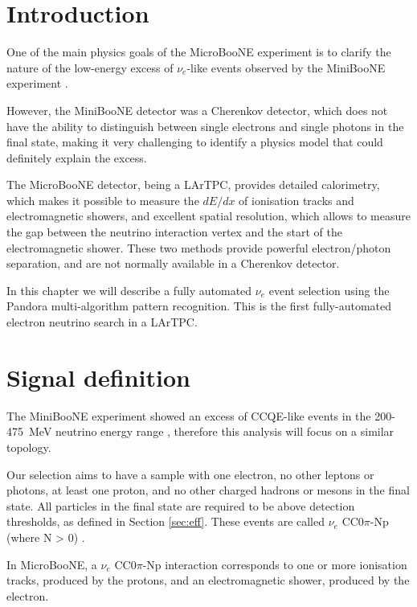 \section{Introduction}
One of the main physics goals of the MicroBooNE experiment is to clarify the nature of the low-energy excess of $\nu_{e}$-like events observed by the MiniBooNE experiment \cite{Aguilar-Arevalo:2018gpe}. 

However, the MiniBooNE detector was a Cherenkov detector, which does not have the ability to distinguish between single electrons and single photons in the final state, making it very challenging to identify a physics model that could definitely explain the excess.

The MicroBooNE detector, being a LArTPC, provides detailed  calorimetry, which makes it possible to measure the $dE/dx$ of ionisation tracks and electromagnetic showers, and excellent spatial resolution, which allows to measure the gap between the neutrino interaction vertex and the start of the electromagnetic shower. These two methods provide powerful electron/photon separation, and are not normally available in a Cherenkov detector. 

In this chapter we will describe a fully automated $\nu_{e}$ event selection using the Pandora multi-algorithm pattern recognition. This is the first fully-automated electron neutrino search in a LArTPC.

\section{Signal definition}
The MiniBooNE experiment showed an excess of CCQE-like events in the 200-475~MeV neutrino energy range \cite{Aguilar-Arevalo:2018gpe}, therefore this analysis will focus on a similar topology.

Our selection aims to have a sample with one electron, no other leptons or photons, at least one proton, and no other charged hadrons or mesons in the final state. All particles in the final state are required to be above detection thresholds, as defined in Section \ref{sec:eff}. These events are called $\nu_{e}$ CC0$\pi$-Np (where N > 0) \cite{Katori:2013nca}. 

In MicroBooNE, a $\nu_{e}$ CC0$\pi$-Np interaction corresponds to one or more ionisation tracks, produced by the protons, and an electromagnetic shower, produced by the electron. 

